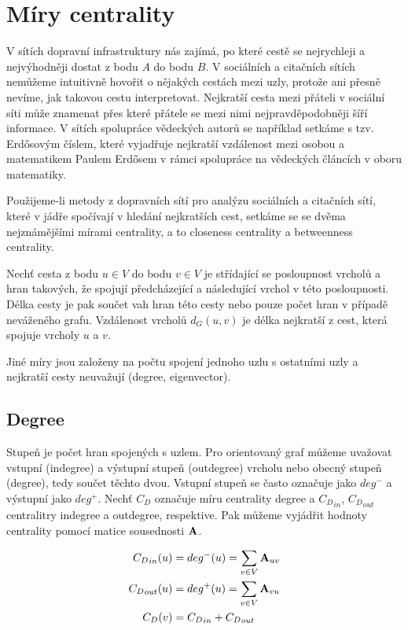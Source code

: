 \documentclass[12pt,titlepage]{report}
\begin{document}
\section{Míry centrality}
V sítích dopravní infrastruktury nás zajímá, po které cestě se nejrychleji a
nejvýhodněji dostat z bodu $A$ do bodu $B$. V sociálních a citačních sítích
nemůžeme intuitivně hovořit o nějakých cestách mezi uzly, protože ani přesně
nevíme, jak takovou cestu interpretovat. Nejkratší cesta mezi přáteli v
sociální síti může znamenat přes které přátele se mezi nimi nejpravděpodobněji
šíří informace. V sítích spolupráce vědeckých autorů se například setkáme s
tzv. Erdősovým číslem, které vyjadřuje nejkratší vzdálenost mezi osobou a
matematikem Paulem Erdősem v rámci spolupráce na vědeckých článcích v oboru
matematiky.

Použijeme-li metody z dopravních sítí pro analýzu sociálních a citačních sítí,
které v jádře spočívají v hledání nejkratších cest, setkáme se se dvěma
nejznámějšími mírami centrality, a to closeness centrality a betweenness
centrality.

Nechť cesta z bodu $u \in V$ do bodu $v \in V$ je střídající se posloupnost
vrcholů a hran takových, že spojují předcházející a následující vrchol v této
posloupnosti. Délka cesty je pak součet vah hran této cesty nebo pouze počet
hran v případě neváženého grafu. Vzdálenost vrcholů $d_G(u, v)$ je délka
nejkratší z cest, která spojuje vrcholy $u$ a $v$.

Jiné míry jsou založeny na počtu spojení jednoho uzlu s ostatními uzly a
nejkratší cesty neuvažují (degree, eigenvector).


\subsection{Degree}
Stupeň je počet hran spojených s uzlem. Pro orientovaný graf můžeme uvažovat
vstupní (indegree) a výstupní stupeň (outdegree) vrcholu nebo obecný stupeň
(degree), tedy součet těchto dvou. Vstupní stupeň se často označuje jako
$deg^-$ a výstupní jako $deg^+$. Nechť $C_D$ označuje míru centrality degree a
${C_D}_{in}$, ${C_D}_{out}$ centralitry indegree a outdegree, respektive. Pak
můžeme vyjádřit hodnoty centrality pomocí matice sousednosti ${\bf A}$.

\begin{align}
\label{eq:degree}
{C_D}_{in}(u) &= deg^-(u)  = \displaystyle\sum\limits_{v \in V} {\bf A}_{uv} \\
{C_D}_{out}(u) &= deg^+(u) = \displaystyle\sum\limits_{v \in V} {\bf A}_{vu} \\
{C_D}(v) &= {C_D}_{in} + {C_D}_{out}
\end{align}
\end{document}
